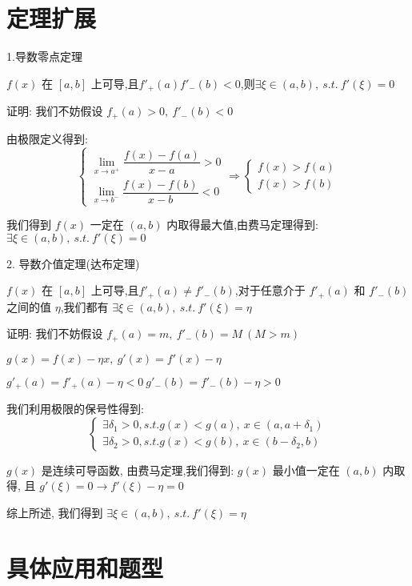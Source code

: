 \section{定理扩展}
\begin{theorem}
	1.导数零点定理

	$f(x)$ 在 $[a,b]$ 上可导,且$f'_{+}(a)f'_{-}(b)<0$,则$\exists \xi\in(a,b),\ s.t.\ f'(\xi)=0$

	证明: 我们不妨假设 $f_{+}(a)>0,\ f'_{-}(b)<0$

	由极限定义得到:
	$$\left\lbrace
		\begin{array}{l}
			\lim\limits_{x\rightarrow a^{+}}\dfrac{f(x)-f(a)}{x-a}>0 \\
			\lim\limits_{x\rightarrow b^{-}}\dfrac{f(x)-f(b)}{x-b}<0
		\end{array}
		\right. \Rightarrow
		\left\lbrace
		\begin{array}{l}
			f(x)>f(a) \\
			f(x)>f(b)
		\end{array}
		\right. $$

	我们得到 $f(x)$ 一定在 $(a,b)$ 内取得最大值,由费马定理得到: $\exists \xi\in(a,b),\ s.t.\ f'(\xi)=0$

	2. 导数介值定理(达布定理)

	$f(x)$ 在 $[a,b]$ 上可导,且$f'_{+}(a)\neq f'_{-}(b)$,对于任意介于 $f'_{+}(a)$ 和 $f'_{-}(b)$ 之间的值 $\eta$,我们都有 $\exists \xi\in(a,b),\ s.t.\ f'(\xi)=\eta$

	证明: 我们不妨假设 $f_{+}(a)=m,\ f'_{-}(b)=M\ (M>m)$

	$g(x)=f(x)-\eta x,\ g'(x)=f'(x)-\eta$

	$g'_{+}(a)=f'_{+}(a)-\eta<0\ g'_{-}(b)=f'_{-}(b)-\eta>0$

	我们利用极限的保号性得到:
	$$\begin{cases}
		\exists \delta_{1}>0, s.t. g(x)<g(a),\ x\in(a,a+\delta_{1}) \\
		\exists \delta_{2}>0, s.t. g(x)<g(b),\ x\in(b-\delta_{2},b)
	\end{cases}$$

	$g(x)$ 是连续可导函数, 由费马定理,我们得到: $g(x)$ 最小值一定在 $(a,b)$ 内取得, 且 $g'(\xi)=0\to f'(\xi) -\eta =0$

	综上所述, 我们得到 $\exists \xi\in(a,b),\ s.t.\ f'(\xi)=\eta$
\end{theorem}
\section{具体应用和题型}

